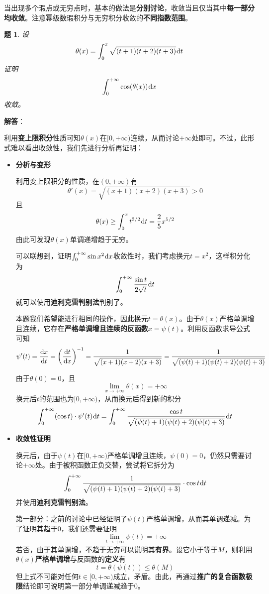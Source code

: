 \documentclass[a4paper,UTF8,fontset=windows,AutoFakeBold]{ctexart}
\newcommand*{\dr}{\hspace{0.07em}\mathrm{d}}
\newcommand*{\note}{\noindent *}
\theoremstyle{ex}
\newtheorem{exercise}{题}
\newcommand{\sol}[1]{{\vspace{5pt}\kaishu\noindent\textbf{解答}：\vspace{-3pt}
\begin{compactitem}
    \item[] #1
\end{compactitem}
}}
\begin{document}
\note 当出现多个瑕点或无穷点时，基本的做法是\textbf{分别讨论}，收敛当且仅当其中\textbf{每一部分均收敛}。注意幂级数瑕积分与无穷积分收敛的\textbf{不同指数范围}。

\begin{framed}
\begin{exercise}
    设
    $$\theta(x)=\int_0^x\sqrt{(t+1)(t+2)(t+3)}\dr t$$
    证明
    $$\int_0^{+\infty}\cos(\theta(x))\dr x$$
    收敛。
\end{exercise}
\sol{
    利用\textbf{变上限积分}性质可知$\theta(x)$在$[0,+\infty)$连续，从而讨论$+\infty$处即可。不过，此形式难以看出收敛性，我们先进行分析再证明：
    \begin{itemize}
        \item \textbf{分析与变形}
        
        利用变上限积分的性质，在$(0,+\infty)$有
        $$\theta'(x)=\sqrt{(x+1)(x+2)(x+3)}>0$$
        且
        $$\theta(x)\ge\int_0^xt^{3/2}\dr t=\frac{2}{5}x^{5/2}$$
        由此可发现$\theta(x)$单调递增趋于无穷。

        可以联想到，证明$\int_0^{+\infty}\sin x^2\dr x$收敛性时，我们考虑换元$t=x^2$，这样积分化为
        $$\int_0^{+\infty}\frac{\sin t}{2\sqrt{t}}\dr t$$
        就可以使用\textbf{迪利克雷判别法}判别了。

        本题我们希望能进行相同的操作，因此换元$t=\theta(x)$。由于$\theta(x)$严格单调增且连续，它存在\textbf{严格单调增且连续的反函数}$x=\psi(t)$。利用反函数求导公式可知
        $$\psi'(t)=\frac{\dr x}{\dr t}=\bigg(\frac{\dr t}{\dr x}\bigg)^{-1}=\frac{1}{\sqrt{(x+1)(x+2)(x+3)}}=\frac{1}{\sqrt{(\psi(t)+1)(\psi(t)+2)(\psi(t)+3)}}$$
        
        由于$\theta(0)=0$，且
        $$\lim_{x\to+\infty}\theta(x)=+\infty$$
        换元后$t$的范围也为$[0,+\infty)$，从而换元后得到新的积分
        $$\int_0^{+\infty}(\cos t)\cdot\psi'(t)\dr t=\int_0^{+\infty}\frac{\cos t}{\sqrt{(\psi(t)+1)(\psi(t)+2)(\psi(t)+3)}}\dr t$$

        \item \textbf{收敛性证明}

        换元后，由于$\psi(t)$在$[0,+\infty)$严格单调增且连续，$\psi(0)=0$，仍然只需要讨论$+\infty$处。由于被积函数正负交替，尝试将它拆分为
        $$\int_0^{+\infty}\frac{1}{\sqrt{(\psi(t)+1)(\psi(t)+2)(\psi(t)+3)}}\cdot\cos t\dr t$$
        并使用\textbf{迪利克雷判别法}。

        第一部分：之前的讨论中已经证明了$\psi(t)$严格单调增，从而其单调递减。为了证明其趋于0，我们还需要证明
        $$\lim_{t\to+\infty}\psi(t)=+\infty$$
        若否，由于其单调增，不趋于无穷可以说明其\textbf{有界}。设它小于等于$M$，则利用$\theta(x)$\textbf{严格单调增}与反函数的\textbf{定义}有
        $$t=\theta(\psi(t))\le\theta(M)$$
        但上式不可能对任何$t\in[0,+\infty)$成立，矛盾。由此，再通过\textbf{推广的复合函数极限}结论即可说明第一部分单调递减趋于0。


\end{itemize}}
\end{framed}
\end{document}
